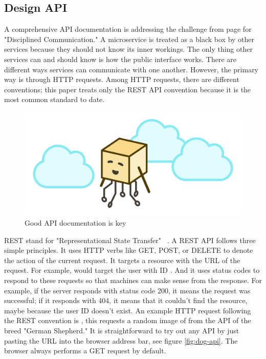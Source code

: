 \subsection{Design API}

A comprehensive API documentation is addressing the challenge from page \pageref{sec:theory:challenges:communication} for "Disciplined Communication." A microservice is treated as a black box by other services because they should not know its inner workings. The only thing other services can and should know is how the public interface works. There are different ways services can communicate with one another. However, the primary way is through HTTP requests. Among HTTP requests, there are different conventions; this paper treats only the REST API convention because it is the most common standard to date.

\begin{figure}[ht]
  \centering
  \includegraphics[width=0.55\linewidth]{assets/illustration-microservice-api.png}
  \caption{Good API documentation is key}
\end{figure}

REST stand for "Representational State Transfer" ~\cite{rest.2020}. A REST API follows three simple principles. It uses HTTP verbs like GET, POST, or DELETE to denote the action of the current request. It targets a resource with the URL of the request. For example,  would target the user with ID . And it uses status codes to respond to these requests so that machines can make sense from the response. For example, if the server responds with status code 200, it means the request was successful; if it responds with 404, it means that it couldn't find the resource, maybe because the user ID doesn't exist. An example HTTP request following the REST convention is , this requests a random image of from the  API of the breed "German Shepherd." It is straightforward to try out any API by just pasting the URL into the browser address bar, see figure \ref{fig:dog-api}. The browser always performs a GET request by default.

